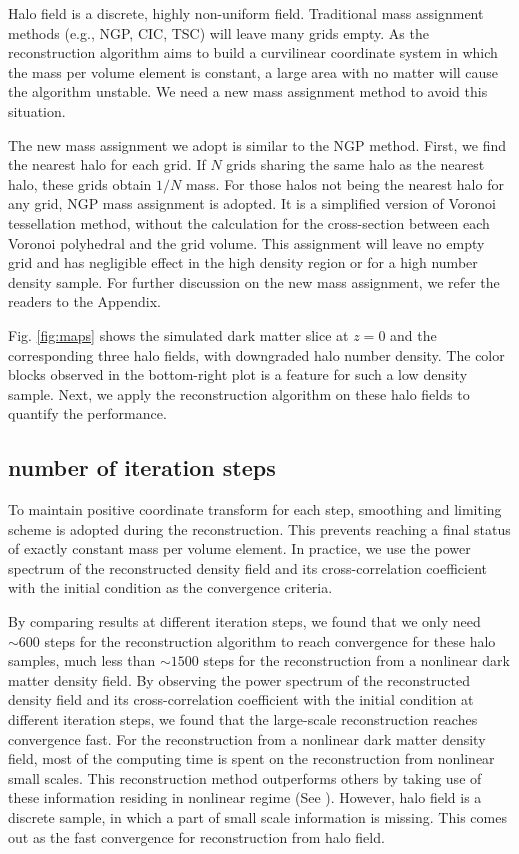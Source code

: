 \documentclass[iop]{emulateapj}
\begin{document}
{Halo field is a discrete, highly non-uniform field.
Traditional mass assignment methods (e.g., NGP, CIC, TSC) will leave many grids empty.
As the reconstruction algorithm aims to build a curvilinear coordinate system in which the mass per volume element is constant, 
a large area with no matter will cause the algorithm unstable.
We need a new mass assignment method to avoid this situation.

The new mass assignment we adopt is similar to the NGP method.
First, we find the nearest halo for each grid.
If $N$ grids sharing the same halo as the nearest halo, these grids obtain $1/N$ mass.
For those halos not being the nearest halo for any grid, NGP mass assignment is adopted.
It is a simplified version of Voronoi tessellation method, without the calculation for the cross-section between each Voronoi polyhedral and the grid volume.
This assignment will leave no empty grid and has negligible effect in the high density region or for a high number density sample.
For further discussion on the new mass assignment, we refer the readers to the Appendix.

Fig. \ref{fig:maps} shows the simulated dark matter slice at $z=0$ and the corresponding three halo fields,
with downgraded halo number density.
The color blocks observed in the bottom-right plot is a feature for such a low density sample.
Next, we apply the reconstruction algorithm on these halo fields to quantify the performance.

\subsection{number of iteration steps}
\label{sec:iteration}

To maintain positive coordinate transform for each step, smoothing and limiting scheme is adopted during the reconstruction.
This prevents reaching a final status of exactly constant mass per volume element.
In practice, we use the power spectrum of the reconstructed density field and its cross-correlation coefficient with the initial condition as the convergence criteria.

By comparing results at different iteration steps, we found that we only need $\sim 600$ steps for the reconstruction algorithm to reach convergence for these halo samples, much less than $\sim 1500$ steps for the reconstruction from a nonlinear dark matter density field.
By observing the power spectrum of the reconstructed density field and its cross-correlation coefficient with the initial condition at different iteration steps, we found that the large-scale reconstruction reaches convergence fast.
For the reconstruction from a nonlinear dark matter density field, most of the computing time is spent on the reconstruction from nonlinear small scales.
This reconstruction method outperforms others by taking use of these information residing in nonlinear regime (See \cite{zhuhm16c}).
However, halo field is a discrete sample, in which a part of small scale information is missing. 
This comes out as the fast convergence for reconstruction from halo field.

}
\end{document}
